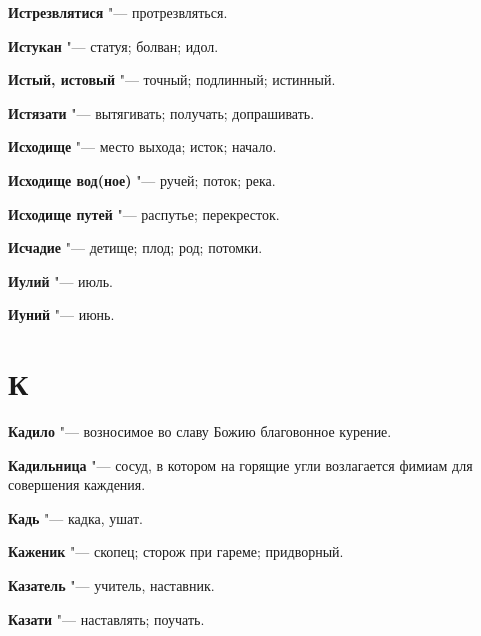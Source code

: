 \begin{mymulticols}{2}
\noindent\textbf{Истрезвлятися} "--- протрезвляться. 




\noindent\textbf{Истукан} "--- статуя; болван; идол. 




\noindent\textbf{Истый, истовый} "--- точный; подлинный; истинный. 




\noindent\textbf{Истязати} "--- вытягивать; получать; допрашивать. 




\noindent\textbf{Исходище} "--- место выхода; исток; начало. 




\noindent\textbf{Исходище вод(ное)} "--- ручей; поток; река. 




\noindent\textbf{Исходище путей} "--- распутье; перекресток. 




\noindent\textbf{Исчадие} "--- детище; плод; род; потомки. 




\noindent\textbf{Иулий} "--- июль. 




\noindent\textbf{Иуний} "--- июнь. 




\section{К}





\noindent\textbf{Кадило} "--- возносимое во славу Божию благовонное курение. 




\noindent\textbf{Кадильница} "--- сосуд, в котором на горящие угли возлагается фимиам для совершения каждения. 




\noindent\textbf{Кадь} "--- кадка, ушат. 




\noindent\textbf{Каженик} "--- скопец; сторож при гареме; придворный. 




\noindent\textbf{Казатель} "--- учитель, наставник. 




\noindent\textbf{Казати} "--- наставлять; поучать. 





\end{mymulticols}
